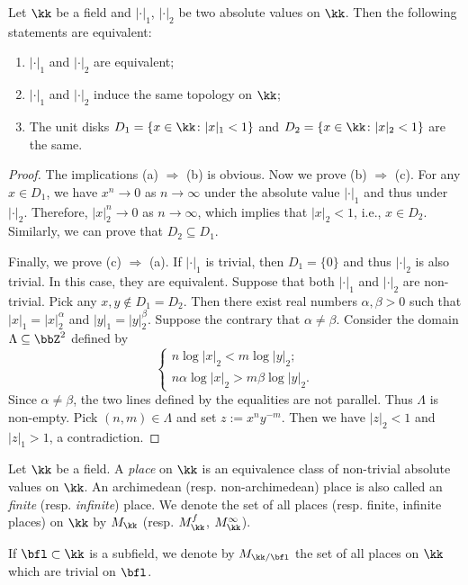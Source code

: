     \begin{lemma}\label{prop:equivalent_of_absolute_values_and_topology_and_unit_disk}
        Let \(\kk\) be a field and \(|\cdot|_1\), \(|\cdot|_2\) be two absolute values on \(\kk\).
        Then the following statements are equivalent:
        \begin{enumerate}
            \item \(|\cdot|_1\) and \(|\cdot|_2\) are equivalent;
            \item \(|\cdot|_1\) and \(|\cdot|_2\) induce the same topology on \(\kk\);
            \item The unit disks \(D_1 = \{x \in \kk\colon |x|_1 < 1\}\) and \(D_2 = \{x \in \kk\colon |x|_2 < 1\}\) are the same.
        \end{enumerate}
    \end{lemma}
    \begin{proof}
        The implications (a) \(\Rightarrow\) (b) is obvious.
        Now we prove (b) \(\Rightarrow\) (c).
        For any \(x \in D_1\), we have \(x^n \to 0\) as \(n \to \infty\) under the absolute value \(|\cdot|_1\) and thus under \(|\cdot|_2\).
        Therefore, \(|x|_2^n \to 0\) as \(n \to \infty\), which implies that \(|x|_2 < 1\), i.e., \(x \in D_2\).
        Similarly, we can prove that \(D_2 \subseteq D_1\).

        Finally, we prove (c) \(\Rightarrow\) (a).
        If \(|\cdot|_1\) is trivial, then \(D_1 = \{0\}\) and thus \(|\cdot|_2\) is also trivial.
        In this case, they are equivalent.
        Suppose that both \(|\cdot|_1\) and \(|\cdot|_2\) are non-trivial.
        Pick any \(x,y \notin D_1 = D_2\).
        Then there exist real numbers \(\alpha, \beta > 0\) such that \(|x|_1 = |x|_2^\alpha\) and \(|y|_1 = |y|_2^\beta\).
        Suppose the contrary that \(\alpha \neq \beta\).
        Consider the domain \(\Lambda \subseteq \bbZ^2\) defined by
        \[ \begin{cases}
            n \log |x|_2 < m \log |y|_2; \\
            n \alpha \log |x|_2 > m \beta \log |y|_2.
        \end{cases} \]
        Since \(\alpha \neq \beta\), the two lines defined by the equalities are not parallel.
        Thus \(\Lambda\) is non-empty.
        Pick \((n,m) \in \Lambda\) and set \(z := x^n y^{-m}\).
        Then we have \(|z|_2 < 1\) and \(|z|_1 > 1\), a contradiction.
    \end{proof}

    \begin{definition}\label{def:place_on_a_field}
        Let \(\kk\) be a field.
        A \emph{place} on \(\kk\) is an equivalence class of non-trivial absolute values on \(\kk\).
        An archimedean (resp. non-archimedean) place is also called an \emph{finite} (resp. \emph{infinite}) place.
        We denote the set of all places (resp. finite, infinite places) on \(\kk\) by \(M_\kk\) (resp. \(M_\kk^f\), \(M_\kk^\infty\)).
        
        If \(\bfl \subset \kk\) is a subfield, we denote by \(M_{\kk/\bfl}\) the set of all places on \(\kk\) which are trivial on \(\bfl\).
    \end{definition}

